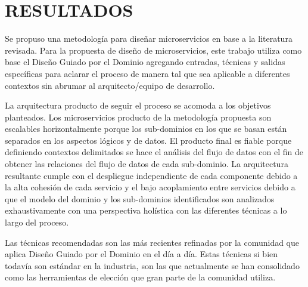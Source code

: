 \section{RESULTADOS}

Se propuso una metodología para diseñar microservicios en base a la literatura revisada.
Para la propuesta de diseño de microservicios, este trabajo utiliza como base el Diseño Guiado por el Dominio
agregando entradas, técnicas y salidas específicas para aclarar el proceso de manera tal que
sea aplicable a diferentes contextos sin abrumar al arquitecto/equipo de desarrollo.

La arquitectura producto de seguir el proceso se acomoda a los objetivos planteados.
Los microservicios producto de la metodología propuesta son escalables horizontalmente porque
los sub-dominios en los que se basan están separados en los aspectos lógicos y de datos.
El producto final es fiable porque definiendo contextos delimitados se hace el análisis del flujo
de datos con el fin de obtener las relaciones del flujo de datos de cada sub-dominio.
La arquitectura resultante cumple con el despliegue independiente de cada componente debido
a la alta cohesión de cada servicio y el bajo acoplamiento entre servicios debido a que el
modelo del dominio y los sub-dominios identificados son analizados exhaustivamente con una
perspectiva holística con las diferentes técnicas a lo largo del proceso.

Las técnicas recomendadas son las más recientes refinadas por la comunidad que aplica Diseño
Guiado por el Dominio en el día a día.
Estas técnicas si bien todavía son estándar en la industria, son las que actualmente se han
consolidado como las herramientas de elección que gran parte de la comunidad utiliza.


